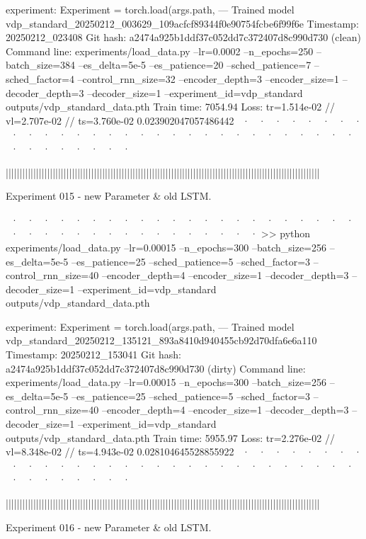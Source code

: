 experiment: Experiment = torch.load(args.path,
--- Trained model   vdp_standard_20250212_003629_109acfcf89344f0e90754fcbe6f99f6e
Timestamp:      20250212_023408
Git hash:       a2474a925b1ddf37c052dd7c372407d8c990d730 (clean)
Command line:   experiments/load_data.py --lr=0.0002 --n_epochs=250 --batch_size=384 --es_delta=5e-5 --es_patience=20 --sched_patience=7 --sched_factor=4 --control_rnn_size=32 --encoder_depth=3 --encoder_size=1 --decoder_depth=3 --decoder_size=1 --experiment_id=vdp_standard outputs/vdp_standard_data.pth
Train time:     7054.94
Loss:           tr=1.514e-02 // vl=2.707e-02 // ts=3.760e-02
0.023902047057486442
~· ~· ~· ~· ~· ~· ~· ~· ~· ~· ~· ~· ~· ~· ~· ~· ~· ~· ~· ~· ~· ~· ~· ~· ~· ~· ~· ~· ~· ~· ~· ~· ~· ~· ~· ~· ~· ~· 



||||||||||||||||||||||||||||||||||||||||||||||||||||||||||||||||||||||||||||||||||||||||||||||||||||||||||||||||||


Experiment 015 - new Parameter & old LSTM. 


~· ~· ~· ~· ~· ~· ~· ~· ~· ~· ~· ~· ~· ~· ~· ~· ~· ~· ~· ~· ~· ~· ~· ~· ~· ~· ~· ~· ~· ~· ~· ~· ~· ~· ~· ~· ~· ~· 
>> python experiments/load_data.py --lr=0.00015 --n_epochs=300 --batch_size=256 --es_delta=5e-5 --es_patience=25 --sched_patience=5 --sched_factor=3 --control_rnn_size=40 --encoder_depth=4 --encoder_size=1 --decoder_depth=3 --decoder_size=1 --experiment_id=vdp_standard outputs/vdp_standard_data.pth

experiment: Experiment = torch.load(args.path,
--- Trained model   vdp_standard_20250212_135121_893a8410d940455cb92d70dfa6e6a110
Timestamp:      20250212_153041
Git hash:       a2474a925b1ddf37c052dd7c372407d8c990d730 (dirty)
Command line:   experiments/load_data.py --lr=0.00015 --n_epochs=300 --batch_size=256 --es_delta=5e-5 --es_patience=25 --sched_patience=5 --sched_factor=3 --control_rnn_size=40 --encoder_depth=4 --encoder_size=1 --decoder_depth=3 --decoder_size=1 --experiment_id=vdp_standard outputs/vdp_standard_data.pth
Train time:     5955.97
Loss:           tr=2.276e-02 // vl=8.348e-02 // ts=4.943e-02
0.028104645528855922
~· ~· ~· ~· ~· ~· ~· ~· ~· ~· ~· ~· ~· ~· ~· ~· ~· ~· ~· ~· ~· ~· ~· ~· ~· ~· ~· ~· ~· ~· ~· ~· ~· ~· ~· ~· ~· ~· 



||||||||||||||||||||||||||||||||||||||||||||||||||||||||||||||||||||||||||||||||||||||||||||||||||||||||||||||||||


Experiment 016 - new Parameter & old LSTM. 



